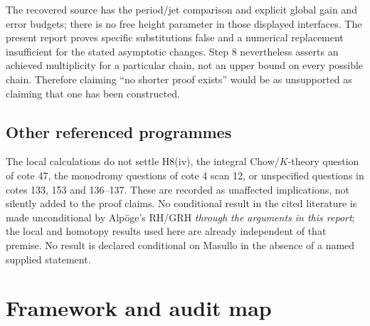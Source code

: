 \documentclass[11pt,a4paper]{article}
\theoremstyle{definition}\newtheorem{remark}[theorem]{Remark}
\begin{document}
The recovered source has the period/jet comparison and explicit global gain and error budgets; there is no free height parameter in those displayed interfaces. The present report proves specific substitutions false and a numerical replacement insufficient for the stated asymptotic changes. Step 8 nevertheless asserts an achieved multiplicity for a particular chain, not an upper bound on every possible chain. Therefore claiming ``no shorter proof exists'' would be as unsupported as claiming that one has been constructed.

\subsection{Other referenced programmes}

The local calculations do not settle H8(iv), the integral Chow/$K$-theory question of cote 47, the monodromy questions of cote 4 scan 12, or unspecified questions in cotes 133, 153 and 136--137. These are recorded as unaffected implications, not silently added to the proof claims. No conditional result in the cited literature is made unconditional by Alp\"oge's RH/GRH \emph{through the arguments in this report}; the local and homotopy results used here are already independent of that premise. No result is declared conditional on Masullo in the absence of a named supplied statement.

\section{Framework and audit map}
\end{document}
